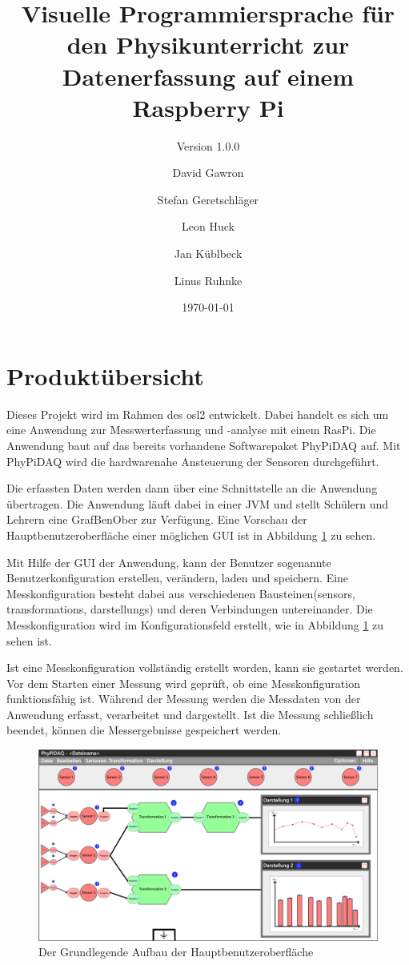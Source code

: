 \documentclass[parskip=full]{scrartcl}
\title{Visuelle Programmiersprache für den Physikunterricht zur Datenerfassung auf einem Raspberry Pi}
\subtitle{Version 1.0.0}
\author{David Gawron \and Stefan Geretschläger \and Leon Huck \and Jan Küblbeck \and Linus Ruhnke}
\date{\today}
\begin{document}
\maketitle

\clearpage
\tableofcontents 					%

\clearpage
\section{Produktübersicht} %

Dieses Projekt wird im Rahmen des \gls{osl2} entwickelt. Dabei handelt es sich um eine Anwendung zur Messwerterfassung und -analyse mit einem \gls{RasPi}. Die Anwendung baut auf das bereits vorhandene Softwarepaket \gls{PhyPiDAQ} auf. Mit \gls{PhyPiDAQ} wird die hardwarenahe Ansteuerung der Sensoren durchgeführt. 

Die erfassten Daten werden dann über eine Schnittstelle an die Anwendung übertragen. Die Anwendung läuft dabei in einer \gls{JVM} und stellt Schülern und Lehrern eine \gls{GrafBenOber} zur Verfügung. Eine Vorschau der Hauptbenutzeroberfläche einer möglichen GUI ist in Abbildung \ref{GUI_Vorschau} zu sehen.


Mit Hilfe der GUI der Anwendung, kann der Benutzer sogenannte \gls{Benutzerkonfiguration} erstellen, verändern, laden und speichern. Eine Messkonfiguration besteht dabei aus verschiedenen Bausteinen(\glspl{sensor}, \glspl{transformation}, \glspl{darstellung}) und deren Verbindungen untereinander. Die Messkonfiguration wird im Konfigurationsfeld erstellt, wie in Abbildung \ref{GUI_Vorschau} zu sehen ist.
 
Ist eine Messkonfiguration vollständig erstellt worden, kann sie gestartet werden. Vor dem Starten einer Messung wird geprüft, ob eine Messkonfiguration funktionsfähig ist. Während der Messung werden die Messdaten von der Anwendung erfasst, verarbeitet und dargestellt. Ist die Messung schließlich beendet, können die Messergebnisse gespeichert werden.


\begin{figure}[htbp]
	\begin{center}
		\includegraphics[width = 14cm]{Grafik/Konkreter-Anwendungsfall-Vorschau.png}
		\caption{Der Grundlegende Aufbau der Hauptbenutzeroberfläche}
		\label{GUI_Vorschau}
	\end{center}
\end{figure}
\end{document}
